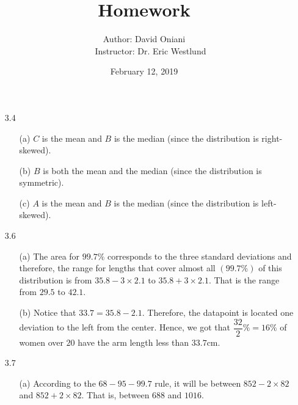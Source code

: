\documentclass[11pt, a4paper]{article}
\title{\bf{Homework \textnumero 3}}
\author{Author: David Oniani
\\
\ \ \ Instructor: Dr. Eric Westlund}
\date{February 12, 2019}
\begin{document}
\maketitle

\begin{itemize}
\item[3.4]
\begin{itemize}
\item[(a)]
$C$ is the mean and $B$ is the median (since the distribution is right-skewed).

\item[]

\item[(b)]
$B$ is both the mean and the median (since the distribution is symmetric).

\item[]

\item[(c)]
$A$ is the mean and $B$ is the median (since the distribution is left-skewed).
\end{itemize}

\item[]
\item[]

\item[3.6]
\begin{itemize}
\item[(a)]
The area for $99.7\%$ corresponds to the three standard deviations and therefore, the range for lengths
that cover almost all $(99.7\%)$ of this distribution is from $35.8 - 3 \times 2.1$
to $35.8 + 3 \times 2.1$. That is the range from $29.5$ to $42.1$.

\item[]

\item[(b)]
Notice that $33.7 = 35.8 - 2.1$. Therefore, the datapoint is located one deviation to the left from the center.
Hence, we got that $\dfrac{32}{2}\% = 16\%$ of women over $20$ have the arm length less than $33.7$cm.
\end{itemize}

\item[]
\item[]

\item[3.7]
\begin{itemize}
\item[(a)]
According to the $68 - 95 - 99.7$ rule, it will be between
$852 - 2 \times 82$ and $852 + 2 \times 82$. That is,
between $688$ and $1016$.


\end{itemize}
\end{itemize}
\end{document}
